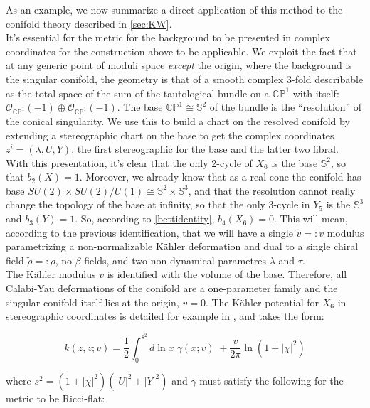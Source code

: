 As an example, we now summarize a direct application of this method to the conifold theory described in \ref{sec:KW}.\\

It's essential for the metric for the background to be presented in complex coordinates for the construction above to be applicable. We exploit the fact that at any generic point of moduli space \emph{except} the origin, where the background is the singular conifold, the geometry is that of a smooth complex 3-fold describable as the total space of the sum of the tautological bundle on a $\mathbb{CP}^1$ with itself: $\mathcal{O}_{\mathbb{CP}^1}(-1) \oplus \mathcal{O}_{\mathbb{CP}^1}(-1)$. The base $\mathbb{CP}^1 \cong \mathbb{S}^2$ of the bundle is the ``resolution'' of the conical singularity. We use this to build a chart on the resolved conifold by extending a stereographic chart on the base to get the complex coordinates $z^i = (\lambda, U, Y)$, the first stereographic for the base and the latter two fibral.\\

With this presentation, it's clear that the only 2-cycle of $X_6$ is the base $\mathbb{S}^2$, so that $b_2(X) = 1$. Moreover, we already know that as a real cone the conifold has base $SU(2)\times SU(2) / U(1) \cong \mathbb{S}^2 \times \mathbb{S}^3$, and that the resolution cannot really change the topology of the base at infinity, so that the only 3-cycle in $Y_5$ is the $\mathbb{S}^3$ and $b_3(Y) = 1$. So, according to \ref{bettidentity}, $b_4(X_6) = 0$. This will mean, according to the previous identification, that we will have a single $\tilde v =: v$ modulus parametrizing a non-normalizable K\"ahler deformation and dual to a single chiral field $\tilde\rho =: \rho$, no $\beta$ fields, and two non-dynamical parametres $\lambda$ and $\tau$. \\

The K\"ahler modulus $v$ is identified with the volume of the base. Therefore, all Calabi-Yau deformations of the conifold are a one-parameter family and the singular conifold itself lies at the origin, $v=0$. The K\"ahler potential for $X_6$ in stereographic coordinates is detailed for example in \cite{PandoZayas}, and takes the form:

\begin{equation}
	k(z,\bar z; v) = \frac{1}{2} \int_0^{s^2} d\ln x \; \gamma(x;v) \; + \frac{v}{2\pi} \ln(1+|\chi|^2)
	\label{}
\end{equation}

where $s^2 = (1+|\chi|^2)(|U|^2 + |Y|^2)$ and $\gamma$ must satisfy the following for the metric to be Ricci-flat:

